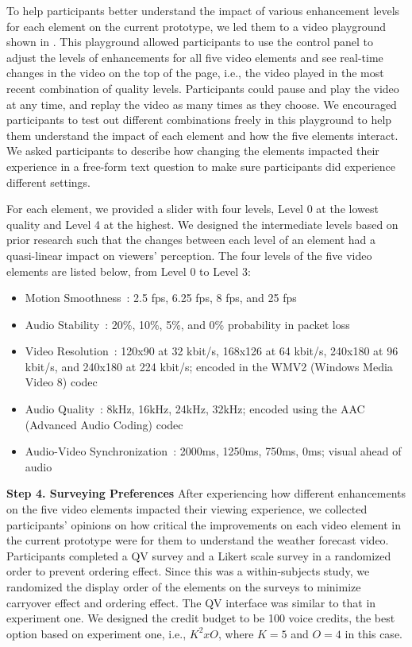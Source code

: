 To help participants better understand the impact of various enhancement levels for each element on the current prototype, we led them to a video playground shown in . This playground allowed participants to use the control panel to adjust the levels of enhancements for all five video elements and see real-time changes in the video on the top of the page, i.e., the video played in the most recent combination of quality levels. Participants could pause and play the video at any time, and replay the video as many times as they choose. We encouraged participants to test out different combinations freely in this playground to help them understand the impact of each element and how the five elements interact. We asked participants to describe how changing the elements impacted their experience in a free-form text question to make sure participants did experience different settings.

For each element, we provided a slider with four levels, Level 0 at the lowest quality and Level 4 at the highest. We designed the intermediate levels based on prior research such that the changes between each level of an element had a quasi-linear impact on viewers' perception. The four levels of the five video elements are listed below, from Level 0 to Level 3:
\begin{itemize}
    \item Motion Smoothness~\cite{huynh2008temporal}: 2.5 fps, 6.25 fps, 8 fps, and 25 fps
    \item Audio Stability~\cite{hardman1998successful}: 20\%, 10\%, 5\%, and 0\% probability in packet loss
    \item Video Resolution~\cite{knoche2005can}: 120x90 at 32 kbit/s, 168x126 at 64 kbit/s, 240x180 at 96 kbit/s, and 240x180 at 224 kbit/s; encoded in the WMV2 (Windows Media Video 8) codec 
    \item Audio Quality~\cite{knoche2008low, noll1993wideband}: 8kHz, 16kHz, 24kHz, 32kHz; encoded using the AAC (Advanced Audio Coding) codec
    \item Audio-Video Synchronization~\cite{steinmetz1996human}: 2000ms, 1250ms, 750ms, 0ms; visual ahead of audio
\end{itemize}

\textbf{Step 4. Surveying Preferences} After experiencing how different enhancements on the five video elements impacted their viewing experience, we collected participants' opinions on how critical the improvements on each video element in the current prototype were for them to understand the weather forecast video. Participants completed  a QV survey and a Likert scale survey in a randomized order to prevent ordering effect. Since this was a within-subjects study, we randomized the display order of the elements on the surveys to minimize carryover effect and ordering effect. The QV interface was similar to that in experiment one. We designed the credit budget to be 100 voice credits, the best option based on experiment one, i.e., $K^2 x O$, where $K=5$ and $O=4$ in this case.

